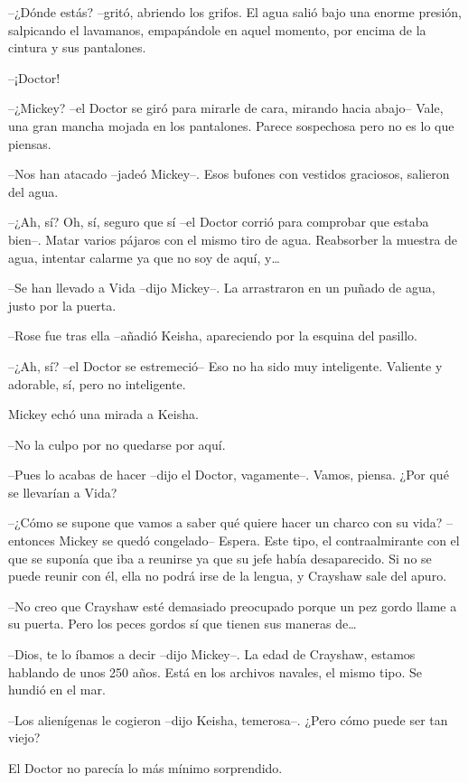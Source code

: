 {--¿Dónde estás? --gritó, abriendo los grifos. El agua salió bajo una
 enorme presión, salpicando el lavamanos, empapándole en aquel momento,
por encima de la cintura y sus pantalones.}

{--¡Doctor!}

{--¿Mickey? --el Doctor se giró para mirarle de cara, mirando hacia
 abajo-- Vale, una gran mancha mojada en los pantalones. Parece
sospechosa pero no es lo que piensas.}

{--Nos han atacado --jadeó Mickey--. Esos bufones con vestidos
graciosos, salieron del agua.}

{--¿Ah, sí? Oh, sí, seguro que sí --el Doctor corrió para comprobar que
 estaba bien--. Matar varios pájaros con el mismo tiro de agua.
 Reabsorber la muestra de agua, intentar calarme ya que no soy de aquí,
 y\ldots{}}

{--Se han llevado a Vida --dijo Mickey--. La arrastraron en un puñado de
agua, justo por la puerta.}

{--Rose fue tras ella --añadió Keisha, apareciendo por la esquina del
pasillo.}

{--¿Ah, sí? --el Doctor se estremeció-- Eso no ha sido muy inteligente.
Valiente y adorable, sí, pero no inteligente.}

{Mickey echó una mirada a Keisha.}

{--No la culpo por no quedarse por aquí.}

{--Pues lo acabas de hacer --dijo el Doctor, vagamente--. Vamos, piensa.
¿Por qué se llevarían a Vida?}

{--¿Cómo se supone que vamos a saber qué quiere hacer un charco con su
 vida? --entonces Mickey se quedó congelado-- Espera. Este tipo, el
 contraalmirante con el que se suponía que iba a reunirse ya que su jefe
 había desaparecido. Si no se puede reunir con él, ella no podrá irse de
la lengua, y Crayshaw sale del apuro.}

{--No creo que Crayshaw esté demasiado preocupado porque un pez gordo
 llame a su puerta. Pero los peces gordos sí que tienen sus maneras
 de\ldots{}}

{--Dios, te lo íbamos a decir --dijo Mickey--. La edad de Crayshaw,
 estamos hablando de unos 250 años. Está en los archivos navales, el
mismo tipo. Se hundió en el mar.}

{--Los alienígenas le cogieron --dijo Keisha, temerosa--. ¿Pero cómo
puede ser tan viejo?}

{El Doctor no parecía lo más mínimo sorprendido.}

